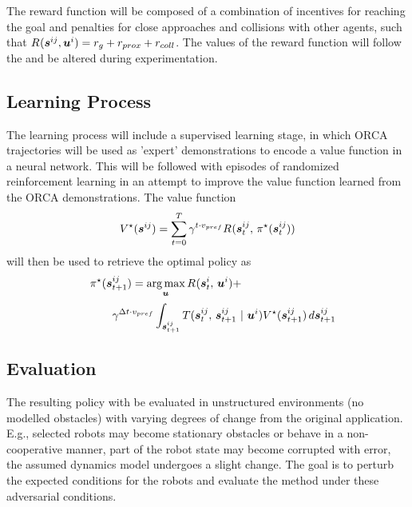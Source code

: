 \documentclass[conference]{IEEEtran}
\begin{document}
The reward function will be composed of a combination of incentives for reaching the goal and penalties for close approaches and collisions with other agents, such that $R_{}(\boldsymbol{s}^{ij}_{},\boldsymbol{u}^{i}_{})=r_{g}+r_{prox}+r_{coll}$. The values of the reward function will follow the \cite{chen2017cadrl} and be altered during experimentation.
\subsection{Learning Process}
The learning process will include a supervised learning stage, in which ORCA trajectories will be used as 'expert' demonstrations to encode a value function in a neural network. This will be followed with episodes of randomized reinforcement learning in an attempt to improve the value function learned from the ORCA demonstrations. The value function
\begin{equation}
V^{\star}(\boldsymbol{s}^{ij}_{})=\sum_{t=0}^T \gamma^{t\cdot v_{pref}}R_{}(\boldsymbol{s}^{ij}_{t}, \, \pi_{}^{\star}(\boldsymbol{s}^{ij}_{t}))
\end{equation}
will then be used to retrieve the optimal policy as
\begin{alignat}{3}
    &&&\pi_{}^{\star}(\boldsymbol{s}^{ij}_{t+1})=\operatorname*{arg\,max}\limits_{\boldsymbol{u}^{}_{}} R_{}(\boldsymbol{s}^{i}_{t}, \, \boldsymbol{u}^{i}_{}) + \\
    &&&\qquad\gamma^{\Delta t \cdot v_{pref}} \int_{\boldsymbol{s}^{ij}_{t+1}} T(\boldsymbol{s}^{ij}_{t}, \, \boldsymbol{s}^{ij}_{t+1} \ | \ \boldsymbol{u}^{i}_{}) V^{\star}(\boldsymbol{s}^{ij}_{t+1}) \, d\boldsymbol{s}^{ij}_{t+1}
\end{alignat}
\subsection{Evaluation}
The resulting policy with be evaluated in unstructured environments (no modelled obstacles) with varying degrees of change from the original application. E.g., selected robots may become stationary obstacles or behave in a non-cooperative manner, part of the robot state may become corrupted with error, the assumed dynamics model undergoes a slight change. The goal is to perturb the expected conditions for the robots and evaluate the method under these adversarial conditions.


\end{document}
